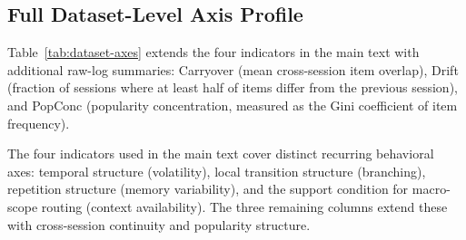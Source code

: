 \subsection{Full Dataset-Level Axis Profile}
Table~\ref{tab:dataset-axes} extends the four indicators in the main text with additional raw-log summaries: Carryover (mean cross-session item overlap), Drift (fraction of sessions where at least half of items differ from the previous session), and PopConc (popularity concentration, measured as the Gini coefficient of item frequency).

\begin{table}[H]
  \centering
  \caption{Full raw-log axis profile across datasets. All values are computed from training logs before model training. Gain is RouteRec's mean test-score gap from the strongest baseline; WinRate is the fraction of nine reported metrics where RouteRec ranks first.}
  \label{tab:dataset-axes}
  \tiny
  \setlength{\tabcolsep}{2.8pt}
  \renewcommand{\arraystretch}{1.02}
\end{table}

The four indicators used in the main text cover distinct recurring behavioral axes: temporal structure (volatility), local transition structure (branching), repetition structure (memory variability), and the support condition for macro-scope routing (context availability). The three remaining columns extend these with cross-session continuity and popularity structure.

